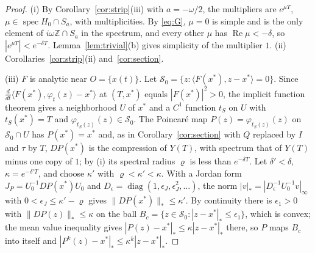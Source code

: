 \documentclass[11pt]{article}
\theoremstyle{definition}
\newcommand{\Z}{\mathbb{Z}}
\newcommand{\re}{\operatorname{Re}}
\newcommand{\spec}{\operatorname{spec}}
\begin{document}
\begin{proof}
(i) By Corollary~\ref{cor:strip}(iii) with $a = -\omega/2$, the multipliers are $e^{\mu T}$, $\mu \in \spec H_0 \cap S_a$, with multiplicities. By \eqref{eq:G}, $\mu = 0$ is simple and is the only element of $i\omega\Z \cap S_a$ in the spectrum, and every other $\mu$ has $\re\mu < -\delta$, so $|e^{\mu T}| < e^{-\delta T}$. Lemma~\ref{lem:trivial}(b) gives simplicity of the multiplier $1$. (ii) Corollaries~\ref{cor:strip}(ii) and~\ref{cor:section}.

(iii) $F$ is analytic near $O = \{x(t)\}$. Let $\mathcal S_0 = \{z : \langle F(x^*), z - x^*\rangle = 0\}$. Since $\frac{d}{dt}\langle F(x^*), \varphi_t(z) - x^*\rangle$ at $(T, x^*)$ equals $|F(x^*)|^2 > 0$, the implicit function theorem gives a neighborhood $U$ of $x^*$ and a $C^1$ function $t_S$ on $U$ with $t_S(x^*) = T$ and $\varphi_{t_S(z)}(z) \in \mathcal S_0$. The Poincar\'e map $P(z) = \varphi_{t_S(z)}(z)$ on $\mathcal S_0 \cap U$ has $P(x^*) = x^*$ and, as in Corollary~\ref{cor:section} with $Q$ replaced by $I$ and $\tau$ by $T$, $DP(x^*)$ is the compression of $Y(T)$, with spectrum that of $Y(T)$ minus one copy of $1$; by (i) its spectral radius $\varrho$ is less than $e^{-\delta T}$. Let $\delta' < \delta$, $\kappa = e^{-\delta'T}$, and choose $\kappa'$ with $\varrho < \kappa' < \kappa$. With a Jordan form $J_P = U_0^{-1}DP(x^*)U_0$ and $D_\epsilon = \operatorname{diag}(1, \epsilon_J, \epsilon_J^2, \dots)$, the norm $|v|_* = |D_\epsilon^{-1}U_0^{-1}v|_\infty$ with $0 < \epsilon_J \le \kappa' - \varrho$ gives $\|DP(x^*)\|_* \le \kappa'$. By continuity there is $\epsilon_1 > 0$ with $\|DP(z)\|_* \le \kappa$ on the ball $B_c = \{z \in \mathcal S_0 : |z - x^*|_* \le \epsilon_1\}$, which is convex; the mean value inequality gives $|P(z) - x^*|_* \le \kappa|z - x^*|_*$ there, so $P$ maps $B_c$ into itself and $|P^k(z) - x^*|_* \le \kappa^k|z - x^*|_*$.


\end{proof}
\end{document}
